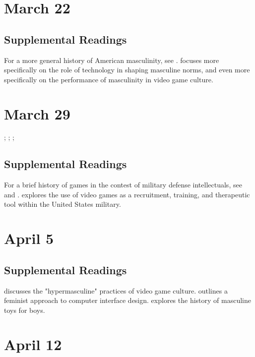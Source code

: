 \documentclass[11pt]{article}
\begin{document}
\section{March 22}


\subsection{Supplemental Readings}

For a more general history of American masculinity, see \cite{Rotundo1994}. \cite{Mellstrom2004} focuses more specifically on the role of technology in shaping masculine norms, and \cite{Burrill2008} even more specifically on the performance of masculinity in video game culture.

\section{March 29}

; ; ; 


\subsection{Supplemental Readings}
For a brief history of games in the contest of military defense intellectuals, see \cite{Ghamari-Tabrizi2000} and \cite{JenniferLight2008}. \cite{Mead2013} explores the use of video games as a recruitment, training, and therapeutic tool within the United States military.

\section{April 5}


\subsection{Supplemental Readings}

\cite{Salter2012} discusses the "hypermasculine" practices of video game culture.  \cite{Bardzell2010} outlines a feminist approach to computer interface design. \cite{Varney2002} explores the history of masculine toys for boys.  

\section{April 12}
\end{document}
